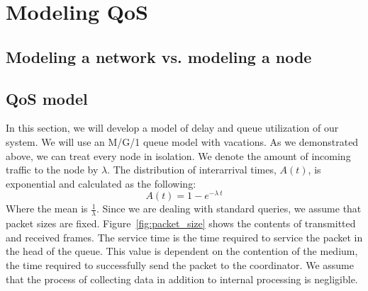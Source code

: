 \section{Modeling QoS}\label{sec:model}

\subsection{Modeling a network vs. modeling a node}

\subsection{QoS model}
In this section, we will develop a model of delay and queue utilization of our system. We will use an M/G/1 queue model with vacations. As we demonstrated above, we can treat every node in isolation. We denote the amount of incoming traffic to the node by $\lambda$. The distribution of interarrival times, $A(t)$, is exponential and calculated as the following:
\begin{equation}
A(t) = 1 - e^{-\lambda\ t}
\end{equation}
Where the mean is $\frac{1}{\lambda}$. Since we are dealing with standard queries, we assume that packet sizes are fixed. Figure~\ref{fig:packet_size} shows the contents of transmitted and received frames. The service time is the time required to service the packet in the head of the queue. 
This value is dependent on the contention of the medium, the time required to successfully send the packet to the coordinator. We assume that the process of collecting data in addition to internal processing is negligible.

